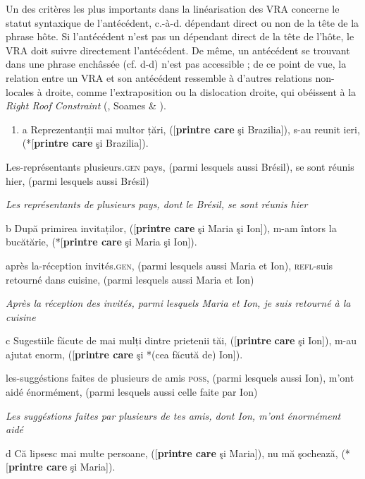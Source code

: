 Un des critères les plus importants dans la linéarisation des VRA concerne le statut syntaxique de l'antécédent, c.-à-d. dépendant direct ou non de la tête de la phrase hôte. Si l'antécédent n'est pas un dépendant direct de la tête de l'hôte, le VRA doit suivre directement l'antécédent. De même, un antécédent se trouvant dans une phrase enchâssée (cf. d-d) n'est pas accessible ; de ce point de vue, la relation entre un VRA et son antécédent ressemble à d'autres relations non-locales à droite, comme l'extraposition ou la dislocation droite, qui obéissent à la \textit{Right Roof Constraint} (\citet{Ross1967}, Soames \& \citet{Perlmutter1979}).


\begin{enumerate}
\item \label{bkm:Ref293501720}a  Reprezentanții mai multor țări, ([\textbf{printre care} şi Brazilia]), s-au reunit ieri, (*[\textbf{printre care} şi Brazilia]). 


\end{enumerate}
Les-représentants plusieurs.\textsc{gen} pays, (parmi lesquels aussi Brésil), se sont réunis hier, (parmi lesquels aussi Brésil)

{\itshape
Les représentants de plusieurs pays, dont le Brésil, se sont réunis hier} 

  b  După primirea invitaților, ([\textbf{printre care} şi Maria şi Ion]), m-am întors la bucătărie, (*[\textbf{printre care} şi Maria şi Ion]).

    après la-réception invités.\textsc{gen,} (parmi lesquels aussi Maria et Ion), \textsc{refl}{}-suis retourné dans cuisine, (parmi lesquels aussi Maria et Ion)

{\itshape
Après la réception des invités, parmi lesquels Maria et Ion, je suis retourné à la cuisine}

  c  Sugestiile făcute de mai mulți dintre prietenii tăi, ([\textbf{printre} \textbf{care} şi Ion]), m-au ajutat enorm, ([\textbf{printre care} şi *(cea făcută de) Ion]).

    les-suggéstions faites de plusieurs de amis \textsc{poss}, (parmi lesquels aussi Ion), m'ont aidé énormément, (parmi lesquels aussi celle faite par Ion)

{\itshape
Les suggéstions faites par plusieurs de tes amis, dont Ion, m'ont énormément aidé}

  d  Că lipsesc mai multe persoane, ([\textbf{printre care} şi Maria]), nu mă şochează, (*[\textbf{printre care} şi Maria]).

